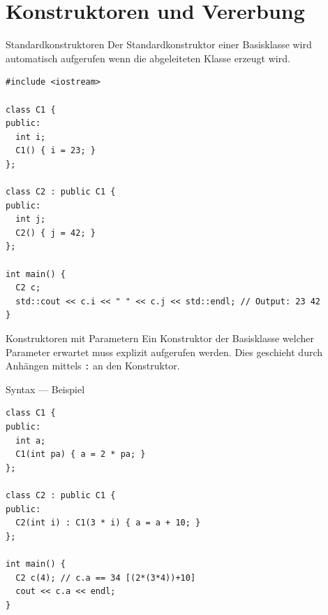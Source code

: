 \documentclass[presentation]{beamer}
\begin{document}
\section{Konstruktoren und Vererbung}
\label{sec:org3127b60}
\begin{frame}[fragile,label={sec:org699fb72}]{Standardkonstruktoren}
 Der Standardkonstruktor einer Basisklasse wird automatisch aufgerufen
wenn die abgeleiteten Klasse erzeugt wird.
\begin{verbatim}
#include <iostream>

class C1 {
public:
  int i;
  C1() { i = 23; }
};

class C2 : public C1 {
public:
  int j;
  C2() { j = 42; }
};

int main() {
  C2 c;
  std::cout << c.i << " " << c.j << std::endl; // Output: 23 42
}
\end{verbatim}
\end{frame}
\begin{frame}[fragile,label={sec:org16c2e6b}]{Konstruktoren mit Parametern}
 Ein Konstruktor der Basisklasse welcher Parameter erwartet \alert{muss
explizit aufgerufen werden}. Dies geschieht durch Anhängen mittels {\color{solarizedYellow}\texttt{:}}
an den Konstruktor.
\begin{exampleblock}{Syntax --- Beispiel}
\begin{verbatim}
class C1 {
public:
  int a;
  C1(int pa) { a = 2 * pa; }
};

class C2 : public C1 {
public:
  C2(int i) : C1(3 * i) { a = a + 10; }
};

int main() {
  C2 c(4); // c.a == 34 [(2*(3*4))+10]
  cout << c.a << endl;
}
\end{verbatim}
\end{exampleblock}
\end{frame}
\end{document}
